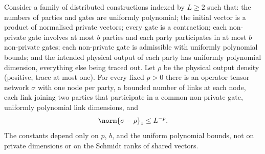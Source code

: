 \precisely
\begin{theorem}\label{thm:compression}
Consider a family of distributed constructions indexed by $L\ge2$ such
that: the numbers of parties and gates are uniformly polynomial; the
initial vector is a product of normalised private vectors; every gate is
a contraction; each non-private gate involves at most $b$ parties and each
party participates in at most $b$ non-private gates; each non-private gate
is admissible with uniformly polynomial bounds; and the intended physical
output of each party has uniformly polynomial dimension, everything else
being traced out. Let $\rho$ be the physical output density (positive,
trace at most one). For every fixed $p>0$ there is an operator tensor
network $\sigma$ with one node per party, a bounded number of links at
each node, each link joining two parties that participate in a common
non-private gate, uniformly polynomial link dimensions, and
\[
 \norm{\sigma-\rho}_1\le L^{-p}.
\]
The constants depend only on $p$, $b$, and the uniform polynomial bounds,
not on private dimensions or on the Schmidt ranks of shared vectors.
\end{theorem}
